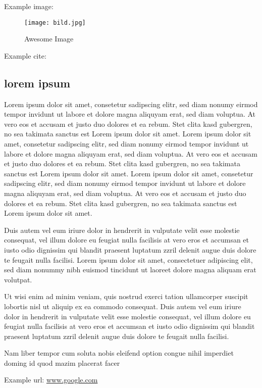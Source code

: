 \documentclass[11pt,twoside,final,a4paper]{amsart}
\theoremstyle{plain}
\theoremstyle{definition}
\theoremstyle{remark}
\numberwithin{equation}{theorem}
\begin{document}
\newpage

Example image:\\
\begin{figure}[htbp]
  \centering
     \texttt{[image: bild.jpg]}
     \caption{Awesome Image}
\end{figure}

Example cite: \cite{test}\\

\subsection{lorem ipsum}
Lorem ipsum dolor sit amet, consetetur sadipscing elitr, sed diam nonumy eirmod tempor invidunt ut labore et dolore magna aliquyam erat, sed diam voluptua. At vero eos et accusam et justo duo dolores et ea rebum. Stet clita kasd gubergren, no sea takimata sanctus est Lorem ipsum dolor sit amet. Lorem ipsum dolor sit amet, consetetur sadipscing elitr, sed diam nonumy eirmod tempor invidunt ut labore et dolore magna aliquyam erat, sed diam voluptua. At vero eos et accusam et justo duo dolores et ea rebum. Stet clita kasd gubergren, no sea takimata sanctus est Lorem ipsum dolor sit amet. Lorem ipsum dolor sit amet, consetetur sadipscing elitr, sed diam nonumy eirmod tempor invidunt ut labore et dolore magna aliquyam erat, sed diam voluptua. At vero eos et accusam et justo duo dolores et ea rebum. Stet clita kasd gubergren, no sea takimata sanctus est Lorem ipsum dolor sit amet.

Duis autem vel eum iriure dolor in hendrerit in vulputate velit esse molestie consequat, vel illum dolore eu feugiat nulla facilisis at vero eros et accumsan et iusto odio dignissim qui blandit praesent luptatum zzril delenit augue duis dolore te feugait nulla facilisi. Lorem ipsum dolor sit amet, consectetuer adipiscing elit, sed diam nonummy nibh euismod tincidunt ut laoreet dolore magna aliquam erat volutpat.

Ut wisi enim ad minim veniam, quis nostrud exerci tation ullamcorper suscipit lobortis nisl ut aliquip ex ea commodo consequat. Duis autem vel eum iriure dolor in hendrerit in vulputate velit esse molestie consequat, vel illum dolore eu feugiat nulla facilisis at vero eros et accumsan et iusto odio dignissim qui blandit praesent luptatum zzril delenit augue duis dolore te feugait nulla facilisi.

Nam liber tempor cum soluta nobis eleifend option congue nihil imperdiet doming id quod mazim placerat facer

\newpage \begin{thebibliography}{999}

Example url: \url{www.google.com}

\end{thebibliography}
\end{document}
